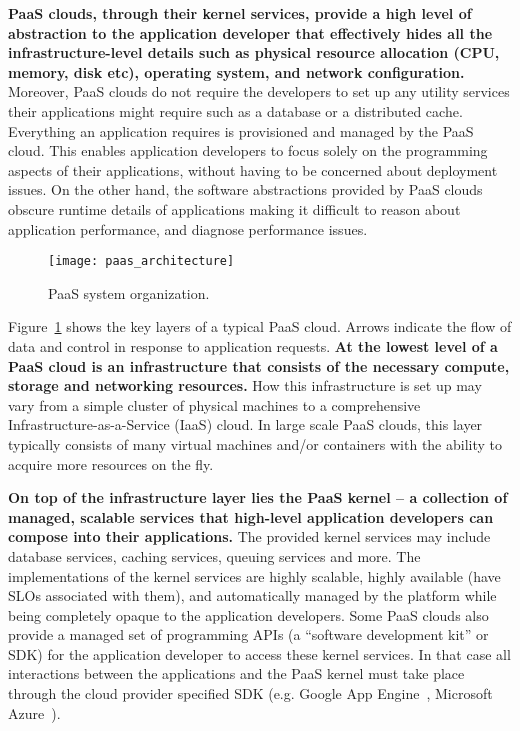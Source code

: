 \textbf{PaaS clouds, through their kernel services, provide a high level of
abstraction to the application developer that effectively hides all the
infra\-structure-level details such as physical resource allocation (CPU,
memory, disk etc), operating system, and network configuration.} 
Moreover, PaaS clouds do not require the developers
to set up any utility services their applications might require such as a 
database or a distributed cache. 
Everything an application requires is provisioned and managed by the PaaS cloud.
This enables
application developers to focus solely on the programming aspects of their
applications, without having to be concerned about deployment issues. On
the other hand, the software abstractions provided by PaaS clouds obscure
runtime details of applications making it difficult to reason about application
performance, and diagnose performance issues.

\begin{figure}
\centering
\texttt{[image: paas\_architecture]}
\caption{PaaS system organization.}
\label{fig:paas_architecture}
\end{figure}

Figure~\ref{fig:paas_architecture} shows the key layers of a typical PaaS cloud. Arrows indicate
the flow of data and control in response to application requests.
\textbf{At the lowest level of a PaaS cloud is an infrastructure that consists of the necessary compute, storage
and networking resources.} How this infrastructure is set up may vary from a simple cluster of physical 
machines to a comprehensive Infrastructure-as-a-Service (IaaS) cloud. In large scale PaaS clouds,
this layer typically consists of many virtual machines and/or containers with the ability to acquire more
resources on the fly.

\textbf{On top of the infrastructure layer lies the PaaS kernel -- a collection of managed, scalable
services that high-level application developers can compose into their applications.} The provided kernel services
may include database services, caching services, queuing services and more. 
The implementations of the kernel services are highly scalable, highly available (have SLOs associated with them),
and automatically managed by the platform while being completely opaque
to the application developers. Some PaaS clouds
also provide a managed set of programming APIs (a ``software development
kit'' or SDK) for the application developer to access these kernel services. 
In that case all interactions between the applications and the PaaS kernel must take place through
the cloud provider specified SDK (e.g. Google App Engine~\cite{gae}, Microsoft Azure~\cite{azure}). 

